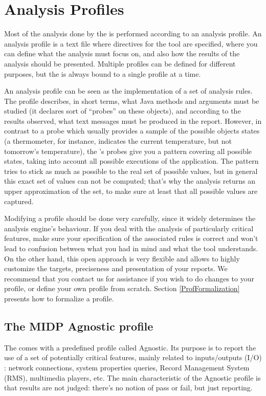 \section{Analysis Profiles}\label{AnaProfs}

Most of the analysis done by the \ma is performed according to an
analysis profile. An analysis profile is a text file where directives
for the tool are specified, where you can define what the analysis must
focus on, and also how the results of the analysis should be
presented. Multiple profiles can be defined for different purposes,
but the \ma is always bound to a single profile at a time. 

An analysis profile can be seen as the implementation of a
set of analysis rules. The profile describes, in short terms, what
Java methods and arguments must be studied (it declares sort of
``probes'' on these objects), and according to the results observed,
what text messages must be produced in the report. However, in
contrast to a probe which usually provides a sample of the possible
objects states (a thermometer, for instance, indicates the current
temperature, but not tomorrow's temperature), the \ma's probes give
you a pattern covering all possible states, taking into
account all possible executions of the application. The pattern tries
to stick as much as possible to the real set of possible values, but
in general this exact set of values can not be computed; that's why
the analysis returns an upper approximation of the set, to make sure
at least that all possible values are captured.

Modifying a profile should be done very carefully, since it widely
determines the analysis engine's behaviour. If you deal with the
analysis of particularly critical features, make sure your
specification of the associated rules is correct and won't lead to
confusion between what you had in mind and what the tool
understands. On the other hand, this open approach is very flexible
and allows to highly customize the targets, preciseness and
presentation of your reports. We recommend that you contact us for
assistance if you wish to do changes to your profile, or define your
own profile from scratch. Section \ref{ProfFormalization} presents how
to formalize a profile.


\subsection{The MIDP Agnostic profile}

The \ma comes with a predefined profile called Agnostic. Its purpose
is to report the use of a set of potentially critical features, mainly
related to inputs/outputs (I/O) : network connections, system properties queries, Record Management
System (RMS), multimedia players, etc. The main characteristic of the Agnostic
profile is that results are not judged: there's no notion of pass or
fail, but just reporting.

